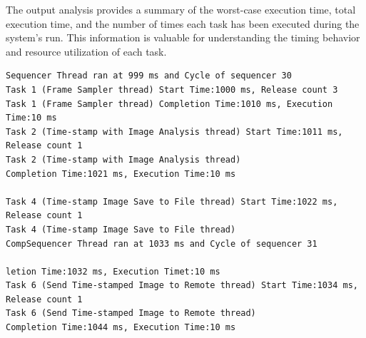 \documentclass[a4paper,11pt]{article}%
\newenvironment{qanda}{\setlength{\parindent}{0pt}}{\bigskip}
\begin{document}
\begin{qanda}
\begin{enumerate}
			The output analysis provides a summary of the worst-case execution time, total execution time, and the number of times each task has been executed during the system's run. This information is valuable for understanding the timing behavior and resource utilization of each task.

			\begin{lstlisting}
Sequencer Thread ran at 999 ms and Cycle of sequencer 30
Task 1 (Frame Sampler thread) Start Time:1000 ms, Release count 3
Task 1 (Frame Sampler thread) Completion Time:1010 ms, Execution Time:10 ms
Task 2 (Time-stamp with Image Analysis thread) Start Time:1011 ms, Release count 1
Task 2 (Time-stamp with Image Analysis thread) 
Completion Time:1021 ms, Execution Time:10 ms

Task 4 (Time-stamp Image Save to File thread) Start Time:1022 ms, Release count 1
Task 4 (Time-stamp Image Save to File thread) 
CompSequencer Thread ran at 1033 ms and Cycle of sequencer 31

letion Time:1032 ms, Execution Timet:10 ms
Task 6 (Send Time-stamped Image to Remote thread) Start Time:1034 ms, Release count 1
Task 6 (Send Time-stamped Image to Remote thread)
Completion Time:1044 ms, Execution Time:10 ms
			\end{lstlisting}




\end{enumerate}
\end{qanda}
\end{document}
